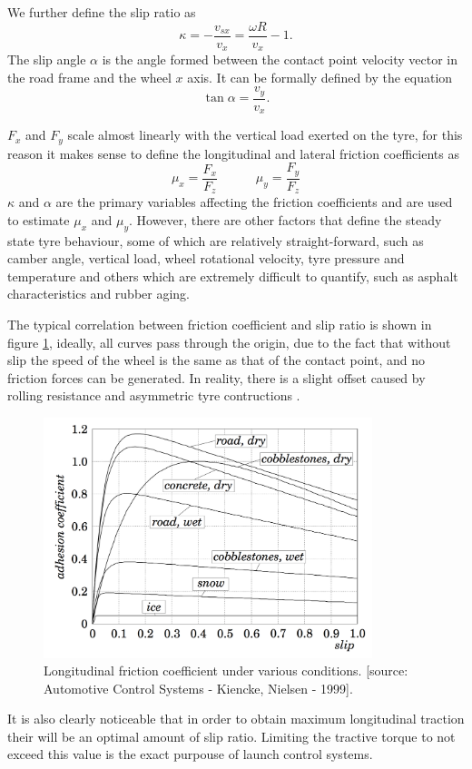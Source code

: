 We further define the slip ratio as
$$ \kappa = - \frac{v_{sx}}{v_{x}} = \frac{\omega R}{v_x}-1.$$
The slip angle $\alpha$ is the angle formed between the contact point velocity vector in the road frame and the wheel $x$ axis. It can be formally defined by the equation
$$\tan{\alpha} = \frac{v_y}{v_x}.$$

$F_x$ and $F_y$ scale almost linearly with the vertical load exerted on the tyre, for this reason it makes sense to define the longitudinal and lateral friction coefficients as
$$ \mu_x = \frac{F_x}{F_z} \quad\quad\quad \mu_y = \frac{F_y}{F_z}$$
$\kappa$ and $\alpha$ are the primary variables affecting the friction coefficients and are used to estimate $\mu_x$ and $\mu_y$. However, there are other factors that define the steady state tyre behaviour, some of which are relatively straight-forward, such as camber angle, vertical load, wheel rotational velocity, tyre pressure and temperature and others which are extremely difficult to quantify, such as asphalt characteristics and rubber aging.

The typical correlation between friction coefficient and slip ratio is shown in
figure \ref{kienckeplot}, ideally, all curves pass through the origin, due to the fact that without slip the speed of the wheel is the same as that of the contact point, and no friction forces can be generated. In reality, there is a slight offset caused by rolling resistance and asymmetric tyre contructions \cite{pac2012}.

\begin{figure}[tb]
  \centering
  \includegraphics[height=7cm]{images/kiencke}
  \caption{Longitudinal friction coefficient under various conditions. [source: Automotive Control Systems - Kiencke, Nielsen - 1999].}
  \label{kienckeplot}
\end{figure}


It is also clearly noticeable that in order to obtain maximum longitudinal traction their will be an optimal amount of slip ratio. Limiting the tractive torque to not exceed this value is the exact purpouse of launch control systems.

